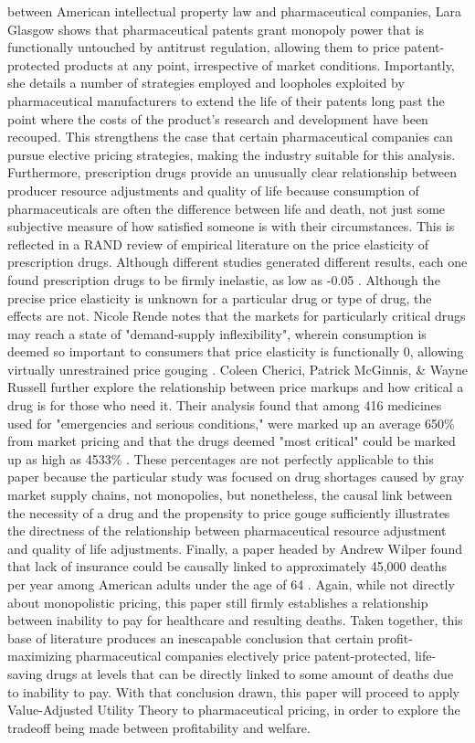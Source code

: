 \documentclass[12pt,english]{article} \usepackage{mathptmx}
\begin{document}
between American intellectual property law and pharmaceutical companies, 
Lara Glasgow shows that pharmaceutical patents grant monopoly power that 
is functionally untouched by antitrust regulation, allowing them to 
price patent-protected products at any point, irrespective of market 
conditions\cite{glasgow_2001}. Importantly, she details a number of 
strategies employed and loopholes exploited by pharmaceutical 
manufacturers to extend the life of their patents long past the point 
where the costs of the product's research and development have been 
recouped\cite{glasgow_2001}. This strengthens the case that certain 
pharmaceutical companies can pursue elective pricing strategies, making 
the industry suitable for this analysis. Furthermore, prescription drugs 
provide an unusually clear relationship between producer resource 
adjustments and quality of life because consumption of pharmaceuticals 
are often the difference between life and death, not just some 
subjective measure of how satisfied someone is with their circumstances. 
This is reflected in a RAND review of empirical literature on the price 
elasticity of prescription drugs. Although different studies generated 
different results, each one found prescription drugs to be firmly 
inelastic, as low as -0.05 \cite{rand02}. Although the precise price 
elasticity is unknown for a particular drug or type of drug, the effects 
are not. Nicole Rende notes that the markets for particularly critical 
drugs may reach a state of "demand-supply inflexibility", wherein 
consumption is deemed so important to consumers that price elasticity is 
functionally 0, allowing virtually unrestrained price gouging 
\cite{rende_2019}. Coleen Cherici, Patrick McGinnis, & Wayne Russell 
further explore the relationship between price markups and how critical 
a drug is for those who need it. Their analysis found that among 416 
medicines used for "emergencies and serious conditions," were marked up 
an average 650\% from market pricing and that the drugs deemed "most 
critical" could be marked up as high as 4533\% \cite{pha11}. These 
percentages are not perfectly applicable to this paper because the 
particular study was focused on drug shortages caused by gray market 
supply chains, not monopolies, but nonetheless, the causal link between 
the necessity of a drug and the propensity to price gouge sufficiently 
illustrates the directness of the relationship between pharmaceutical 
resource adjustment and quality of life adjustments. Finally, a paper 
headed by Andrew Wilper found that lack of insurance could be causally 
linked to approximately 45,000 deaths per year among American adults 
under the age of 64 \cite{wilper09}. Again, while not directly about 
monopolistic pricing, this paper still firmly establishes a relationship 
between inability to pay for healthcare and resulting deaths. Taken 
together, this base of literature produces an inescapable conclusion 
that certain profit-maximizing pharmaceutical companies electively price 
patent-protected, life-saving drugs at levels that can be directly 
linked to some amount of deaths due to inability to pay. With that 
conclusion drawn, this paper will proceed to apply Value-Adjusted 
Utility Theory to pharmaceutical pricing, in order to explore the 
tradeoff being made between profitability and welfare. 
\end{document}

